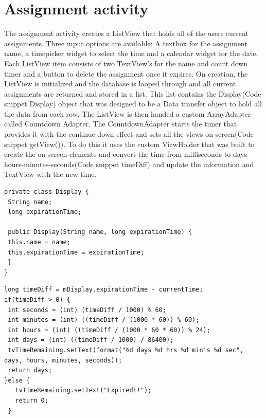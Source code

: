 \clearpage
\section{Assignment activity}
The assignment activity creates a ListView that holds all of the users current assignments. Three input options are available: A textbox for the assignment name, a timepicker widget to select the time and a calendar widget for the date. Each ListView item consists of two TextView's for the name and count down timer and a button to delete the assignment once it expires. On creation, the ListView is initialized and the database is looped through and all current assignments are returned and stored in a list. This list contains the Display(Code snippet Display) object that was designed to be a Data transfer object to hold all the data from each row. The ListView is then handed a custom ArrayAdapter called Countdown Adapter. The CountdownAdapter starts the timer that provides it with the continue down effect and sets all the views on screen(Code snippet getView()). To do this it uses the custom ViewHolder that was built to create the on screen elements and convert the time from milliseconds to days-hours-minutes-seconds(Code snippet timeDiff) and update the information and TextView with the new time.

\begin{verbatim}
private class Display {
 String name;
 long expirationTime;

 public Display(String name, long expirationTime) {
 this.name = name;
 this.expirationTime = expirationTime;
 }
}
\end{verbatim}

\begin{verbatim}
long timeDiff = mDisplay.expirationTime - currentTime;
if(timeDiff > 0) {
 int seconds = (int) (timeDiff / 1000) % 60;
 int minutes = (int) ((timeDiff / (1000 * 60)) % 60);
 int hours = (int) ((timeDiff / (1000 * 60 * 60)) % 24);
 int days = (int) ((timeDiff / 1000) / 86400);
 tvTimeRemaining.setText(format("%d days %d hrs %d min's %d sec", days, hours, minutes, seconds));
 return days;
}else {
   tvTimeRemaining.setText("Expired!!");
   return 0;
 }
\end{verbatim}

